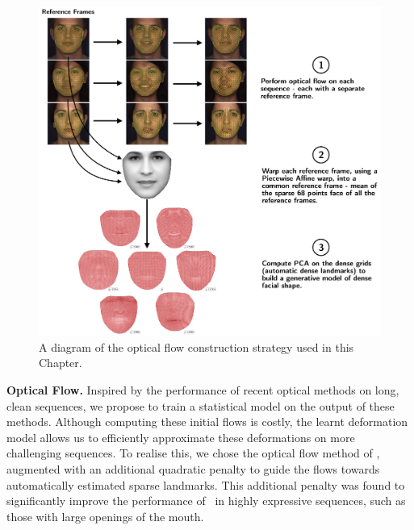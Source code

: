 \begin{figure}[t]
    \centering
    \includegraphics[width=\textwidth]{face_flow/images/of_pca_basis/optical_flow_basis_construction}
    \caption{A diagram of the optical flow construction strategy used in this
             Chapter.}
\label{fig:optical_flow_pca_basis_construction}
\end{figure}
\textbf{Optical Flow.}
Inspired by the performance of recent optical methods on long, clean sequences,
we propose to train a statistical model on the output of these methods.
Although computing these initial flows is costly, the learnt deformation model
allows us to efficiently approximate these deformations on more challenging
sequences. To realise this, we chose the optical flow method of
\citet{garg2013variational}, augmented with an additional quadratic penalty
to guide the flows towards automatically estimated sparse landmarks.
This additional penalty was found to significantly improve the performance
of~\cite{garg2013variational} in highly expressive sequences, such as those with
large openings of the mouth.

